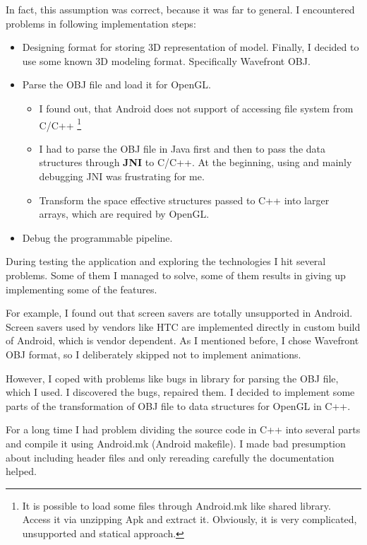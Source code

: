 In fact, this assumption was correct, because it was far to general.
I encountered problems in following implementation steps:
\begin{itemize}
    \item Designing format for storing 3D representation of model. Finally, I decided to use some known 3D modeling format. Specifically Wavefront OBJ.
    \item Parse the OBJ file and load it for OpenGL.
        \begin{itemize}
            \item I found out, that Android does not support of accessing file system from C/C++ \footnote{It is possible to load some files through Android.mk like shared library. Access it via unzipping Apk and extract it. Obviously, it is very complicated, unsupported and statical approach.}
            \item I had to parse the OBJ file in Java first and then to pass the data structures through {\bf JNI} to C/C++.
            At the beginning, using and mainly debugging JNI was frustrating for me. 
            \item Transform the space effective structures passed to C++ into larger arrays, which are required by OpenGL.
        \end{itemize}
    \item Debug the programmable pipeline.
\end{itemize}

During testing the application and exploring the technologies I hit several problems.
Some of them I managed to solve, some of them results in giving up implementing some of the features.

For example, I found out that screen savers are totally unsupported in Android. Screen savers
used by vendors like HTC are implemented directly in custom build of Android, which is vendor dependent.
As I mentioned before, I chose Wavefront OBJ format, so I deliberately skipped not to implement animations.

However, I coped with problems like bugs in library for parsing the OBJ file, which I used. 
I discovered the bugs, repaired them. 
I decided to implement some parts of the transformation of OBJ file to data structures for OpenGL in C++.
    
For a long time I had problem dividing the source code in C++ into several parts
and compile it using Android.mk (Android makefile). I made bad presumption about including header files and
only rereading carefully the documentation helped.

